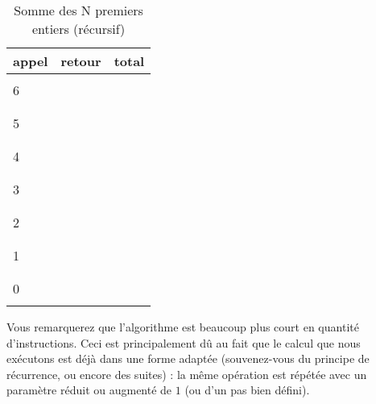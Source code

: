 \documentclass[11pt,a4paper]{article}
\begin{document}
\begin{table}[!ht]
\begin{minipage}{0.19\textwidth}
  \end{minipage}
  \hfillx
  \begin{minipage}{0.28\textwidth}
    \centering
    \begin{tabular}{|C{1.1cm}|C{1.1cm}|C{1.1cm}|}
        \hline
        appel & retour & total \\
        \hline
              &        & \\
        6     &        & \\
              &        & \\
        \hline
              &        & \\
        5     &        & \\
              &        & \\
        \hline
              &        & \\
        4     &        & \\
              &        & \\
        \hline
              &        & \\
        3     &        & \\
              &        & \\
        \hline
              &        & \\
        2     &        & \\
              &        & \\
        \hline
              &        & \\
        1     &        & \\
              &        & \\
        \hline
              &        & \\
        0     &        & \\
              &        & \\
        \hline
    \end{tabular}
  \end{minipage}
  \caption{Somme des N premiers entiers (récursif)}
  \label{somme-n-premiers-entiers-recursif}
\end{table}


\bigskip

Vous remarquerez que l'algorithme est beaucoup plus court en quantité d'instructions.
Ceci est principalement dû au fait que le calcul que nous exécutons est déjà dans une forme adaptée (souvenez-vous du principe de récurrence, ou encore des suites) : la même opération est répétée avec un paramètre réduit ou augmenté de $ 1 $ (ou d'un pas bien défini).
\end{document}
